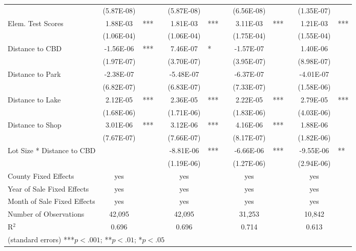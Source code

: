 \documentclass{article}\usepackage[]{graphicx}\usepackage[]{color}
\newcommand\T{\rule{0pt}{2.6ex}}       %
\begin{document}
\begin{table}
{\begin{tabular}{lclcclcclccl}
          & (5.87E-08) &       &       & (5.87E-08) &   &   & (6.56E-08) &       &       & (1.35E-07) &  \\
\T  Elem. Test Scores & 1.88E-03 & *** &   & 1.81E-03 & ***   &   & 3.11E-03 & *** & & 1.21E-03 & *** \\
          & (1.06E-04) &  &   & (1.06E-04) &   &       & (1.75E-04) &       &       & (1.55E-04) &  \\
\T  Distance to CBD & -1.56E-06 & ***  &  & 7.46E-07 & *     &  & -1.57E-07 &   &       & 1.40E-06 &  \\
          & (1.97E-07) &       &       & (3.70E-07) &       &       & (3.95E-07) &   &   & (8.98E-07) &  \\
\T  Distance to Park & -2.38E-07 &   &    & -5.48E-07 &    &   & -6.37E-07 &  &   & -4.01E-07 &  \\
          & (6.82E-07) & &   & (6.83E-07) &       &       & (7.33E-07) &       &       & (1.58E-06) &  \\
\T  Distance to Lake & 2.12E-05 & ***   &   & 2.36E-05 & ***   &   & 2.22E-05 & ***   & & 2.79E-05 & *** \\
          & (1.68E-06) &       &    & (1.71E-06) &   &    & (1.83E-06) & &  & (4.03E-06) &  \\
\T  Distance to Shop & 3.01E-06 & ***   &    & 3.12E-06 & ***   & & 4.16E-06 & ***   &    & 1.88E-06 &  \\
          & (7.67E-07) &       &       & (7.66E-07) &       &       & (8.17E-07) &  & & (1.82E-06) &  \\
\T  Lot Size * Distance to CBD &  &   & & -8.81E-06 & *** & & -6.66E-06 & ***   &       & -9.55E-06 & ** \\
          &   &   &   & (1.19E-06) &       &       & (1.27E-06) &       &       & (2.94E-06) &  \\
\T  County Fixed Effects & yes   &   &   & yes   &       &       & yes   &       &       & yes   &  \\
    Year of Sale Fixed Effects & yes   &   &   & yes   &   &       & yes   &       &       & yes   &  \\
    Month of Sale Fixed Effects & yes   &   &   & yes   &   &       & yes   &       &       & yes   &  \\ \hline
\T  Number of Observations &        42,095  &   &  &    42,095  & & &   31,253  & & &    10,842  &  \\
    R$^2$   & 0.696 &       &       & 0.696 &       &       & 0.714 &       &       & 0.613 &  \\
 \multicolumn{12}{l}{(standard errors) ***$p<.001$; **$p<.01$; *$p<.05$}  \\
    \end{tabular}%
}
\end{table}
\end{document}
